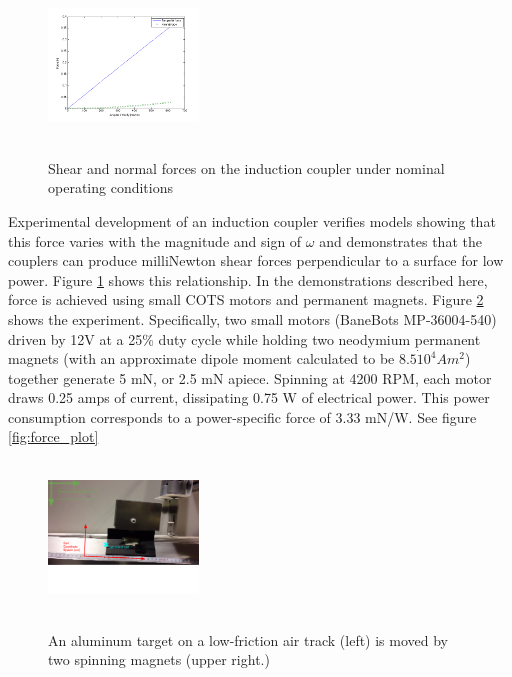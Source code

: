 \begin{figure}
\includegraphics[width = 4cm, height = 4cm ]{figures/tan_v_norm_force.png}
\label{fig:tan_v_norm_f}
\caption{Shear and normal forces on the induction coupler under nominal operating conditions}
\end{figure}

Experimental development of an induction coupler verifies models showing that this force varies with the magnitude and sign of $\omega$ and demonstrates that the couplers can produce milliNewton shear forces perpendicular to a surface for low power. Figure \ref{fig:tan_v_norm_f} shows this relationship. In the demonstrations described here, force is achieved using small COTS motors and permanent magnets. Figure \ref{fig:cart_picture} shows the experiment. Specifically, two small motors (BaneBots MP-36004-540) driven by 12V at a 25\% duty cycle while holding two neodymium permanent magnets (with an approximate dipole moment calculated to be $8.5\dot10^4 Am^2$) together generate 5 mN, or 2.5 mN apiece. Spinning at 4200 RPM, each motor draws 0.25 amps of current, dissipating 0.75 W of electrical power. This power consumption corresponds to a power-specific force of 3.33 mN/W. See figure \ref{fig:force_plot}

\begin{figure}
\includegraphics[width = 4cm, height = 4cm ]{figures/cart_on_track.png}
\label{fig:cart_picture}
\caption{An aluminum target on a low-friction air track (left) is moved by two spinning magnets (upper right.)}
\end{figure}


